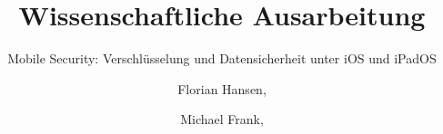 \documentclass{hsflensburg}
\title{Wissenschaftliche Ausarbeitung}
\subtitle{Mobile Security: Verschlüsselung und Datensicherheit unter iOS und iPadOS}
\author{
	Florian Hansen,
	\and
	Michael Frank,
}
\begin{document}
	\maketitle
  \tableofcontents

  \pagebreak
  
  

	\clearpage
	
	
\end{document}
